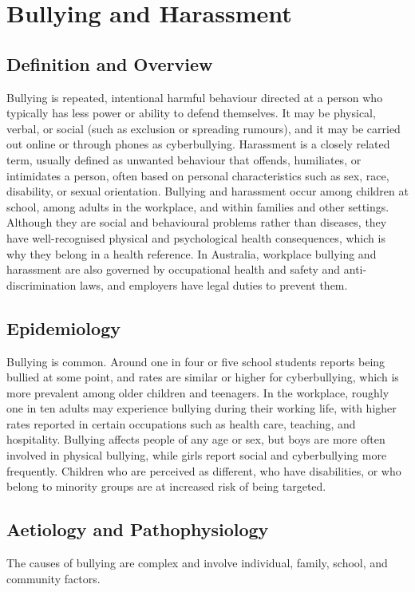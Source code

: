 \chapter{Bullying and Harassment}

\section*{Definition and Overview}
Bullying is repeated, intentional harmful behaviour directed at a person who typically has less power or ability to defend themselves. It may be physical, verbal, or social (such as exclusion or spreading rumours), and it may be carried out online or through phones as cyberbullying. Harassment is a closely related term, usually defined as unwanted behaviour that offends, humiliates, or intimidates a person, often based on personal characteristics such as sex, race, disability, or sexual orientation. Bullying and harassment occur among children at school, among adults in the workplace, and within families and other settings. Although they are social and behavioural problems rather than diseases, they have well-recognised physical and psychological health consequences, which is why they belong in a health reference. In Australia, workplace bullying and harassment are also governed by occupational health and safety and anti-discrimination laws, and employers have legal duties to prevent them.

\section*{Epidemiology}
Bullying is common. Around one in four or five school students reports being bullied at some point, and rates are similar or higher for cyberbullying, which is more prevalent among older children and teenagers. In the workplace, roughly one in ten adults may experience bullying during their working life, with higher rates reported in certain occupations such as health care, teaching, and hospitality. Bullying affects people of any age or sex, but boys are more often involved in physical bullying, while girls report social and cyberbullying more frequently. Children who are perceived as different, who have disabilities, or who belong to minority groups are at increased risk of being targeted.

\section*{Aetiology and Pathophysiology}
The causes of bullying are complex and involve individual, family, school, and community factors.

